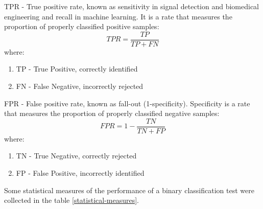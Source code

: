   \begin{definition}[TPR]
  	\label{TPR}
  	TPR - True positive rate, known as sensitivity in signal detection and biomedical engineering and recall in machine learning. It is a rate that measures the proportion of properly classified positive samples:
  	\[TPR=\frac{TP}{TP+FN}\]
  	where:
\begin{enumerate}
  		\item TP - True Positive, correctly identified
  		\item FN - False Negative, incorrectly rejected
\end{enumerate}
  \end{definition}
  \begin{definition}[FPR]
  	\label{FPR}
  	FPR - False positive rate, known as fall-out (1-specificity). Specificity is a rate that measures the proportion of properly classified negative samples:
  	\[FPR=1-\frac{TN}{TN+FP}\]
  	where:
\begin{enumerate}
  		\item TN - True Negative, correctly rejected
  		\item FP - False Positive, incorrectly identified
\end{enumerate}
  	
  \end{definition}
  
 Some statistical measures of the performance of a binary classification test were collected in the table \ref{statistical-measures}.

